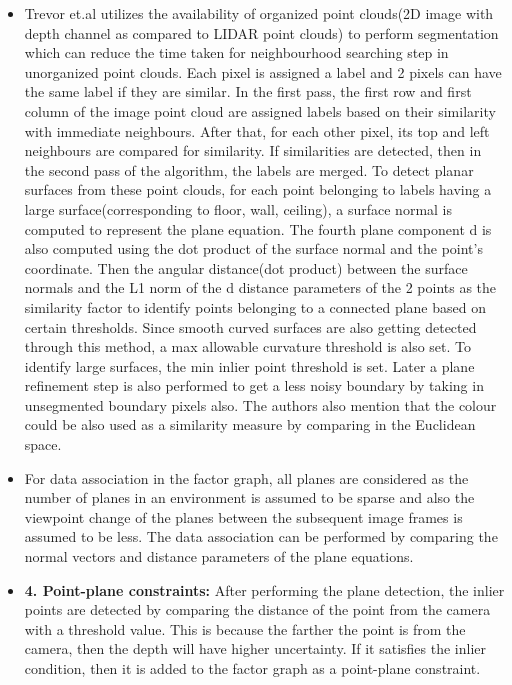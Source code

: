 \documentclass[report.tex]{subfiles}
\begin{document}
\begin{itemize}
\item Trevor et.al \cite{effplaneseg} utilizes the availability of organized point clouds(2D image with depth channel as compared to LIDAR point clouds) to perform segmentation which can reduce the time taken for neighbourhood searching step in unorganized point clouds. Each pixel is assigned a label and 2 pixels can have the same label if they are similar. In the first pass, the first row and first column of the image point cloud are assigned labels based on their similarity with immediate neighbours. After that, for each other pixel, its top and left neighbours are compared for similarity. If similarities are detected, then in the second pass of the algorithm, the labels are merged. To detect planar surfaces from these point clouds, for each point belonging to labels having a large surface(corresponding to floor, wall, ceiling), a surface normal is computed to represent the plane equation. The fourth plane component d is also computed using the dot product of the surface normal and the point's coordinate. Then the angular distance(dot product) between the surface normals and the L1 norm of the d distance parameters of the 2 points as the similarity factor to identify points belonging to a connected plane based on certain thresholds. Since smooth curved surfaces are also getting detected through this method, a max allowable curvature threshold is also set. To identify large surfaces, the min inlier point threshold is set. Later a plane refinement step is also performed to get a less noisy boundary by taking in unsegmented boundary pixels also. The authors also mention that the colour could be also used as a similarity measure by comparing in the Euclidean space.
\item For data association in the factor graph, all planes are considered as the number of planes in an environment is assumed to be sparse and also the viewpoint change of the planes between the subsequent image frames is assumed to be less. The data association can be performed by comparing the normal vectors and distance parameters of the plane equations.

\item \textbf{4. Point-plane constraints: } After performing the plane detection, the inlier points are detected by comparing the distance of the point from the camera with a threshold value. This is because the farther the point is from the camera, then the depth will have higher uncertainty. If it satisfies the inlier condition, then it is added to the factor graph as a point-plane constraint.


\end{itemize}
\end{document}
